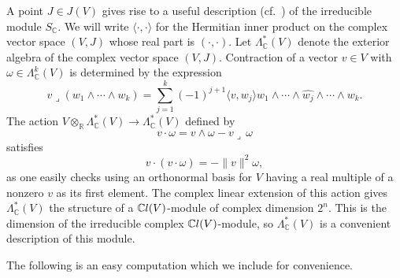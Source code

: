 \documentclass[11pt]{article}
\numberwithin{equation}{section}
\newcommand{\R}{\mathbb{R}}
\newcommand{\C}{\mathbb{C}}
\newcommand{\CCl}{\mathbb{C}{\rm l}}
\numberwithin{equation}{section}
\begin{document}
A point $J \in J(V)$ gives rise to a useful description (cf.~\cite[Chapter I, equation~(5.27)]{LM})
of the irreducible module $S_\C$.
We will write $\langle \cdot, \cdot \rangle$ for the Hermitian inner product on the complex vector space $(V,J)$ whose real part is $ (\cdot, \cdot )$.
Let $\Lambda_\C^*(V)$ denote the exterior algebra of the complex vector space $(V,J)$.
Contraction of a vector $v \in V$ with $\omega \in \Lambda_\C^k(V)$ is determined by the expression
\[
v \lrcorner (w_1 \wedge \cdots \wedge w_k) = \sum_{j=1}^k (-1)^{j+1}\langle v, w_j \rangle w_1 \wedge \cdots \wedge \widehat{w_j} \wedge \cdots \wedge w_k.
\]
The action $V \otimes_\R \Lambda_\C^*(V) \to \Lambda_\C^*(V)$ defined by
\begin{equation*}
v \cdot \omega = v \wedge \omega - v \lrcorner \, \omega
\end{equation*}
satisfies
\begin{equation*}
v\cdot(v \cdot \omega) = - \|v\|^2 \omega,
\end{equation*}
as one easily checks using an orthonormal basis for $V$ having a
real multiple of a nonzero $v$ as its first element. The complex linear extension of this action gives $\Lambda_\C^*(V)$ the structure of a $\CCl(V)$-module of complex dimension $2^n$. This is the dimension of the irreducible complex $\CCl(V)$-module, so $\Lambda_\C^*(V)$ is a convenient description of this module.

The following is an easy computation which we include for convenience.
\end{document}
